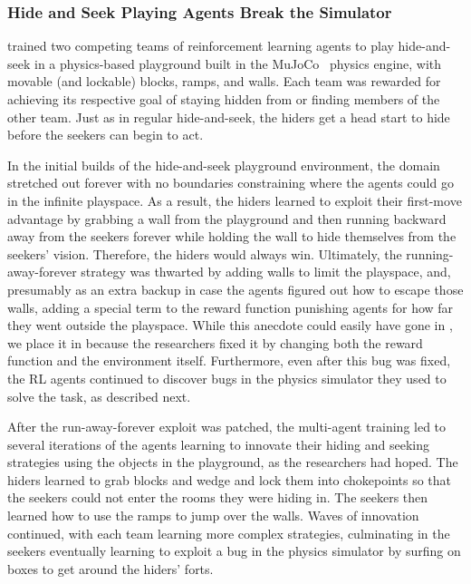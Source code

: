 \subsubsection{Hide and Seek Playing Agents Break the Simulator~\citep{baker2019emergent}}
\label{sec:hideseek}

\citet{baker2019emergent} trained two competing teams of reinforcement learning agents to play hide-and-seek in a physics-based playground built in the MuJoCo~\citep{todorov2012mujoco} physics engine, with movable (and lockable) blocks, ramps, and walls.
Each team was rewarded for achieving its respective goal of staying hidden from or finding members of the other team. 
Just as in regular hide-and-seek, the hiders get a head start to hide before the seekers can begin to act.


In the initial builds of the hide-and-seek playground environment, the domain stretched out forever with no boundaries constraining where the agents could go in the infinite playspace. 
As a result, the hiders learned to exploit their first-move advantage by grabbing a wall from the playground and then running backward away from the seekers forever while holding the wall to hide themselves from the seekers' vision.
Therefore, the hiders would always win. 
Ultimately, the running-away-forever strategy was thwarted by adding walls to limit the playspace, and, presumably as an extra backup in case the agents figured out how to escape those walls, adding a special term to the reward function punishing agents for how far they went outside the playspace.
While this anecdote could easily have gone in , we place it in  because the researchers fixed it by changing both the reward function and the environment itself. Furthermore, even after this bug was fixed, the RL agents continued to discover bugs in the physics simulator they used to solve the task, as described next.

After the run-away-forever exploit was patched, the multi-agent training led to several iterations of the agents learning to innovate their hiding and seeking strategies using the objects in the playground, as the researchers had hoped. The hiders learned to grab blocks and wedge and lock them into chokepoints so that the seekers could not enter the rooms they were hiding in. The seekers then learned how to use the ramps to jump over the walls. Waves of innovation continued, with each team learning more complex strategies, culminating in the seekers eventually learning to exploit a bug in the physics simulator by surfing on boxes to get around the hiders' forts.

